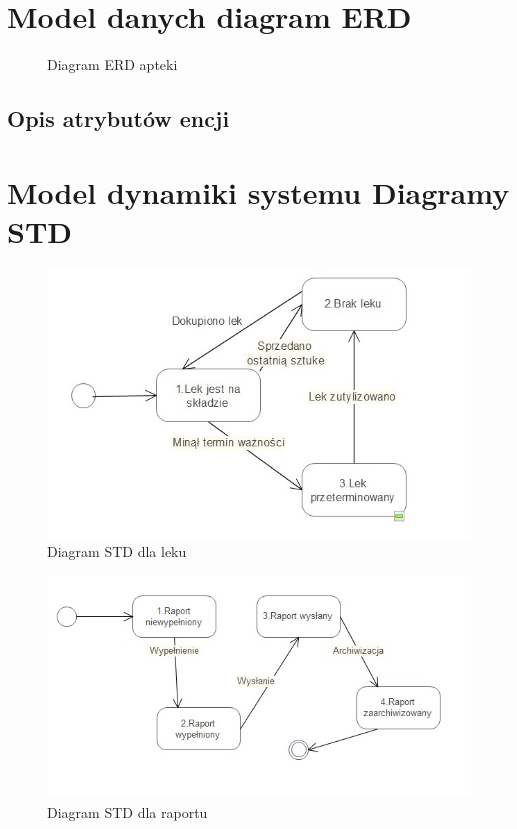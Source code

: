 \documentclass[a4paper, 11pt]{article}
\begin{document}
	\section{Model danych diagram ERD}
	
			\begin{figure}[H]
			\caption{Diagram ERD apteki}
			\end{figure}
	\subsection{Opis atrybutów encji}
	\section{Model dynamiki systemu Diagramy STD}
	\begin{figure}[H]
\centerline{\includegraphics[scale=1]{STDlek.jpg}}
\caption{Diagram STD dla leku}
\end{figure}
	\begin{figure}[H]
\centerline{\includegraphics[scale=1]{STDraport.jpg}}
\caption{Diagram STD dla raportu}
\end{figure}
\end{document}
